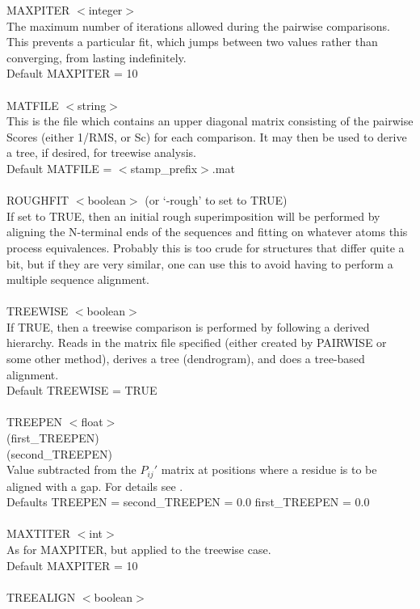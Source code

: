 MAXPITER $<$integer$>$\\
The maximum number of iterations allowed during the pairwise
comparisons.  This prevents a particular fit, which jumps between
two values rather than converging, from lasting indefinitely.\\
Default MAXPITER = 10\\
\\
MATFILE $<$string$>$\\
This is the file which contains an upper diagonal matrix consisting
of the pairwise Scores (either 1/RMS, or Sc) for each comparison. 
It may then be used to derive a tree, if desired, for treewise 
analysis.\\
Default MATFILE = $<$stamp\_prefix$>$.mat\\
\\
ROUGHFIT $<$boolean$>$ (or `-rough' to set to TRUE)\\
If set to TRUE, then an initial rough superimposition will be
performed by aligning the N-terminal ends of the sequences and
fitting on whatever atoms this process equivalences.  Probably
this is too crude for structures that differ quite a bit, but if
they are very similar, one can use this to avoid having to
perform a multiple sequence alignment.\\
\\
TREEWISE $<$boolean$>$\\
If TRUE, then a treewise comparison is performed by following a
derived hierarchy.   Reads in the matrix file specified (either
created by PAIRWISE or some other method), derives a tree (dendrogram),
and does a tree-based alignment.\\
Default TREEWISE = TRUE\\
\\
TREEPEN $<$float$>$\\
(first\_TREEPEN)\\
(second\_TREEPEN)\\
Value subtracted from the $P_{ij}{\prime}$ matrix at positions where a
residue is to be aligned with a gap.  For details see \cite{rb92b}.\\
Defaults TREEPEN = second\_TREEPEN = 0.0  first\_TREEPEN = 0.0\\
\\
MAXTITER $<$int$>$\\
As for MAXPITER, but applied to the treewise case.\\
Default MAXPITER = 10\\
\\
TREEALIGN $<$boolean$>$\\
